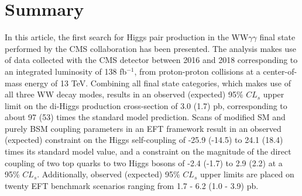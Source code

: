 \section{Summary} \label{section:Summary}

In this article, the first search for Higgs pair production in the WW$\gamma\gamma$ final state performed by the CMS collaboration has been presented. The analysis makes use of 
data collected with the CMS detector between 2016 and 2018 corresponding to an integrated luminosity of 138 \unit{fb}$^{-1}$, from proton-proton collisions at a center-of-mass energy of 13 TeV.
Combining all final state categories, which makes use of all three WW decay modes, results in an observed (expected) 95\% $CL_{s}$ upper limit on the di-Higgs production cross-section of 
3.0 (1.7) pb, corresponding to about 97 (53) times the standard model prediction. Scans of modified SM and purely BSM coupling parameters in an EFT framework result in an
observed (expected) constraint on the Higgs self-coupling of -25.9 (-14.5) to 24.1 (18.4) times its standard model value, and a constraint on the magnitude of the 
direct coupling of two top quarks to two Higgs bosons of -2.4 (-1.7) to 2.9 (2.2) at a 95\% $CL_{s}$. Additionally, observed (expected) 95\% $CL_{s}$ upper limits are 
placed on twenty EFT benchmark scenarios ranging from 1.7 - 6.2 (1.0 - 3.9) pb.
